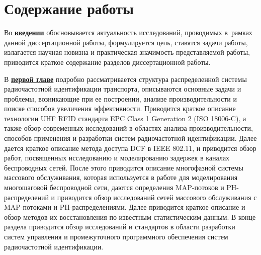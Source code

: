 \section*{Содержание работы}
Во \underline{\textbf{введении}} обосновывается актуальность исследований, проводимых в~рамках данной диссертационной работы, формулируется цель, ставятся задачи работы, излагается научная новизна и практическая значимость представляемой работы, приводится краткое содержание разделов диссертационной работы.


В \underline{\textbf{первой главе}} подробно рассматривается структура распределенной системы радиочастотной идентификации транспорта, описываются основные задачи и проблемы, возникающие при ее построении, анализе производительности и поиске способов увеличения эффективности. Приводится краткое описание технологии UHF RFID стандарта EPC Class 1 Generation 2 (ISO 18006-C), а также обзор современных исследований в областях анализа производительности, способов применения и разработки систем радиочастотной идентификации. Далее дается краткое описание метода доступа DCF в IEEE 802.11, и приводится обзор работ, посвященных исследованию и моделированию задержек в каналах беспроводных сетей. После этого приводится описание многофазной системы массового обслуживания, которая используется в работе для моделирования многошаговой беспроводной сети, даются определения MAP-потоков и PH-распределений и приводится обзор исследований сетей массового обслуживания с MAP-потоками и PH-распределениями. Далее приводится краткое описание и обзор методов их восстановления по известным статистическим данным. В конце раздела приводится обзор исследований и стандартов в области разработки систем управления и промежуточного программного обеспечения систем радиочастотной идентификации.


